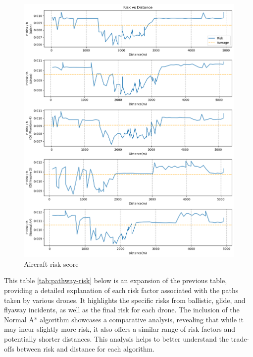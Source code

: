 \documentclass[12pt]{report}
\begin{document}
        \begin{figure}[H]
            \centering
            \includegraphics[width=\textwidth]{Plot/risk_vs_distance.png}
            \caption{Aircraft risk score}
            \label{fig:total-path1}
        \end{figure}


        This table \ref{tab:pathway-risk} below is an expansion of the previous table, providing a detailed explanation
        of each risk factor associated with the paths taken by various drones. It highlights the specific risks from
        ballistic, glide, and flyaway incidents, as well as the final risk for each drone. The inclusion of the Normal
        A* algorithm showcases a comparative analysis, revealing that while it may incur slightly more risk, it also
        offers a similar range of risk factors and potentially shorter distances. This analysis helps to better
        understand the trade-offs between risk and distance for each algorithm.
\end{document}
